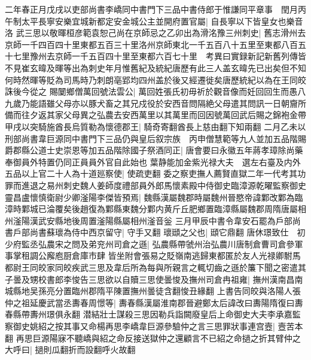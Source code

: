 二年春正月戊戌以吏部尚書李嶠同中書門下三品中書侍郎于惟謙同平章事　閏月丙午制太平長寧安樂宜城新都定安金城公主並開府置官屬|{
	自長寧以下皆皇女也樂音洛}
武三思以敬暉桓彦範袁恕己尚在京師忌之乙卯出為滑洺豫三州刺史|{
	舊志滑州去京師一千四百四十里東都五百三十里洛州京師東北一千五百八十五里至東都八百五十七里豫州去京師一千五百四十里至東都六百七十里　考異曰實録新記新舊列傳皆不見崔玄暐及暉等出為刺史年月惟舊紀及統紀唐歷有此三人盖玄暐先已出矣但不知何時然暉等貶為司馬時乃刺朗亳郢均四州盖於後又經遷徙矣唐歷統紀以為在王同皎誅後今從之}
賜䦩鄉僧萬回號法雲公|{
	萬回姓張氏初毋祈於觀音像而妊回回生而愚八九歲乃能語雖父母亦以豚犬畜之其兄戍役於安西音問隔絶父母遣其問訊一日朝齎所備而往夕返其家父母異之弘農去安西萬里以其萬里而回因號萬回武后賜之錦袍金帶}
甲戌以突騎施酋長烏質勒為懷德郡王|{
	騎奇寄翻酋長上慈由翻下知兩翻}
二月乙未以刑部尚書韋巨源同中書門下三品仍與皇后叙宗族　丙申僧慧範等九人並加五品階賜爵郡縣公道士史崇恩等加五品階除國子祭酒同正|{
	唐會要曰永徽五年蔣孝璋除尚藥奉御員外特置仍同正員員外官自此始也}
葉静能加金紫光禄大夫　選左右臺及内外五品以上官二十人為十道廵察使|{
	使疏吏翻}
委之察吏撫人薦賢直獄二年一代考其功罪而進退之易州刺史魏人姜師度禮部員外郎馬懷素殿中侍御史臨漳源乾曜監察御史靈昌盧懷慎衛尉少卿滏陽李傑皆預焉|{
	魏縣漢屬魏郡時屬魏州晉愍帝諱鄴改鄴為臨漳時鄴城已淪覆矣後趙復為鄴縣東魏分鄴内黄斤丘肥鄉置臨漳縣屬魏郡周隋唐屬相州滏陽漢武安縣地後周置滏陽縣屬相州滏音釡}
三月甲辰中書令韋安石罷為戶部尚書戶部尚書蘇瓌為侍中西京留守|{
	守手又翻}
瓌頲之父也|{
	頲它鼎翻}
唐休璟致仕　初少府監丞弘農宋之問及弟兖州司倉之遜|{
	弘農縣帶虢州治弘農川唐制倉曹司倉參軍事掌租調公廨庖厨倉庫市肆}
皆坐附會張易之貶嶺南逃歸東都匿於友人光禄卿駙馬都尉王同皎家同皎疾武三思及韋后所為每與所親言之輒切齒之遜於簾下聞之密遣其子曇及甥校書郎李悛告三思欲以自贖三思使曇悛及撫州司倉冉祖雍|{
	撫州漢南昌南城縣地吴孫亮分置臨州郡隋平陳置撫州曇徒含翻悛丑緣翻}
上書告同皎與洛陽人張仲之祖延慶武當丞夀春周憬等|{
	夀春縣漢屬淮南郡晉避鄭太后諱改曰夀陽隋復曰夀春縣帶夀州璟俱永翻}
潜結壯士謀殺三思因勒兵詣闕廢皇后上命御史大夫李承嘉監察御史姚紹之按其事又命楊再思李嶠韋巨源參驗仲之言三思罪狀事連宫壼|{
	壼苦本翻}
再思巨源陽寐不聽嶠與紹之命反接送獄仲之還顧言不已紹之命撾之折其臂仲之大呼曰|{
	撾則瓜翻折而設翻呼火故翻}
